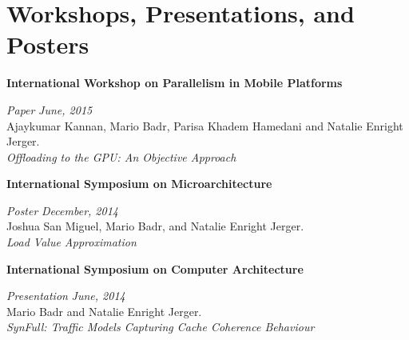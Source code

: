 \section{\sc Workshops, Presentations, and Posters}

{\bf International Workshop on Parallelism in Mobile Platforms}
\vspace{-.3cm}

{\em Paper} \hfill {\em June, 2015}\\
Ajaykumar Kannan, Mario Badr, Parisa Khadem Hamedani and Natalie Enright Jerger.\\
\textit{Offloading to the GPU: An Objective Approach}


{\bf International Symposium on Microarchitecture}
\vspace{-.3cm}

{\em Poster} \hfill {\em December, 2014}\\
Joshua San Miguel, Mario Badr, and Natalie Enright Jerger.\\
\textit{Load Value Approximation}

{\bf International Symposium on Computer Architecture}
\vspace{-.3cm}

{\em Presentation} \hfill {\em June, 2014}\\
Mario Badr and Natalie Enright Jerger.\\
\textit{SynFull: Traffic Models Capturing Cache Coherence Behaviour}




